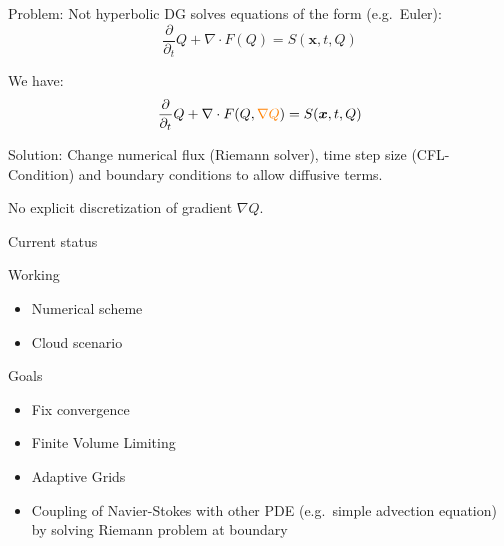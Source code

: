 \documentclass{beamer}
\begin{document}
\begin{frame}{Problem: Not hyperbolic}
  DG solves equations of the form (e.g.\ Euler):
  \begin{equation}
  \label{eq:conservation-law}
 \frac{\partial}{\partial_t}  Q + \nabla \cdot F(Q) = S(\bm{x}, t, Q)
\end{equation}

We have:
\begin{equation}
  \label{eq:conservation-law}
 \frac{\partial}{\partial_t}  Q + \nabla \cdot F(Q, \textcolor{orange}{\nabla Q}) = S(\bm{x}, t, Q)
\end{equation}

Solution:
Change numerical flux (Riemann solver), time step size (CFL-Condition) and boundary conditions to allow diffusive terms.

\alert{No explicit discretization} of gradient $\nabla Q$.
\end{frame}

\begin{frame}{Current status}
  \begin{block}{Working}
  \begin{itemize}
  \item Numerical scheme
  \item Cloud scenario
  \end{itemize}
  \end{block}

  \begin{block}{Goals}
  \begin{itemize}
  \item Fix convergence
  \item Finite Volume Limiting
  \item Adaptive Grids
  \item Coupling of Navier-Stokes with other PDE (e.g.\ simple advection equation) by solving Riemann problem at boundary
  \end{itemize}
  \end{block}
\end{frame}

\begin{frame}{Current status of Convergence-Tests}
  \begin{figure}[h]
    \centering
   \texttt{[image: \{l2\_error]}}
    \caption{Mesh-Size vs $L_2$ error }
    \label{fig:l2-error}
  \end{figure}
\end{frame}
\end{document}
